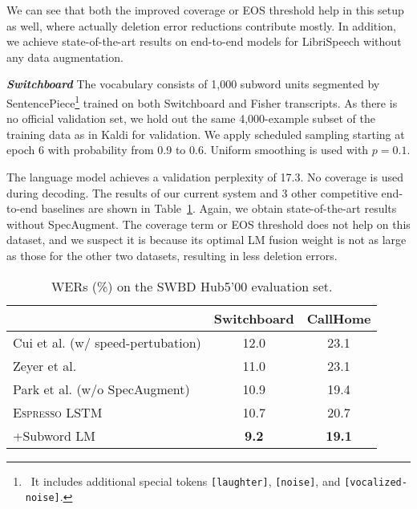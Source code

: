 \documentclass{article}
\def\espresso{\textsc{Espresso}\xspace}
\begin{document}
We can see that both the improved coverage or EOS threshold help in this setup as well, where actually deletion error reductions contribute mostly. In addition, we achieve state-of-the-art results on end-to-end models for LibriSpeech without any data augmentation.

\vspace{0.2cm}
\noindent \textbf{\textit{Switchboard}}\quad
The vocabulary consists of 1,000 subword units segmented by SentencePiece\footnote{~It includes additional special tokens \texttt{[laughter]}, \texttt{[noise]}, and \texttt{[vocalized-noise]}.} trained on both Switchboard and Fisher transcripts. As there is no official validation set, we hold out the same 4,000-example subset of the training data as in Kaldi for validation. We apply scheduled sampling starting at epoch 6 with probability from 0.9 to 0.6. Uniform smoothing is used with $p = 0.1$.

The language model achieves a validation perplexity of 17.3. No coverage is used during decoding. The results of our current system and 3 other competitive end-to-end baselines are shown in Table~\ref{tab:swbd_lstm}. Again, we obtain state-of-the-art results without SpecAugment. The coverage term or EOS threshold does not help on this dataset, and we suspect it is because its optimal LM fusion weight is not as large as those for the other two datasets, resulting in less deletion errors.

\begin{table}[tb]
  \caption{WERs (\%) on the SWBD Hub5'00 evaluation set.}
  \label{tab:swbd_lstm}
  \centering
  \begin{adjustbox}{max width=\linewidth}
  \begin{tabular}{l c c}
    \toprule
    & Switchboard & CallHome \\
    \midrule
    Cui et al. \cite{cui2018improving} (w/ speed-pertubation) & 12.0 & 23.1 \\
    Zeyer et al. \cite{zeyer2018comprehensive} & 11.0 & 23.1 \\
    Park et al. \cite{specaugment} (w/o SpecAugment) & 10.9 & 19.4 \\
    \midrule
    \espresso LSTM & 10.7 & 20.7 \\
    \quad+Subword LM & \textbf{9.2} & \textbf{19.1} \\
    \bottomrule
  \end{tabular}
  \end{adjustbox}
\end{table}
\end{document}
